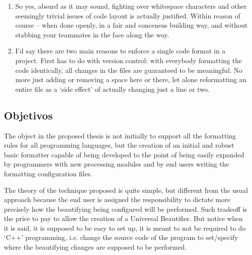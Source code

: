 \begin{englishtext}
\begin{enumerate}[leftmargin=*]
        \item
        \begin{citacao}
        So yes, absurd as it may sound, fighting over whitespace characters and other seemingly
        trivial issues of code layout is actually justified. Within reason of course -- when done
        openly, in a fair and concensus building way, and without stabbing your teammates in the
        face along the way. \cite{Atwood}
        \end{citacao}

        \item
        \begin{citacao}
        I'd say there are two main reasons to enforce a single code format in a project. First has
        to do with version control: with everybody formatting the code identically, all changes in
        the files are guaranteed to be meaningful. No more just adding or removing a space here or
        there, let alone reformatting an entire file as a `side effect' of actually changing just a
        line or two. \cite{Geukens}
        \end{citacao}

    \end{enumerate}



\subsection{Objetivos}

    The object in the proposed thesis is not initially to support all the
    formatting rules for all programming languages, but the creation of an
    initial and robust basic formatter capable of being developed to the point
    of being easily expanded by programmers with new processing modules and by
    end users writing the formatting configuration files.

    The theory of the technique proposed is quite simple, but different from the
    usual approach because the end user is assigned the responsibility to
    dictate more precisely how the beautifying being configured will be
    performed. Such tradeoff is the price to pay to allow the creation of a
    Universal Beautifier. But notice when it is said, it is supposed to be easy
    to set up, it is meant to not be required to do `C++' programming, i.e.
    change the source code of the program to set/specify where the beautifying
    changes are supposed to be performed.



\end{englishtext}
